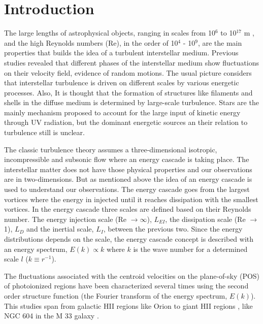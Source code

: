 \documentclass[fleqn,usenatbib, useAMS, a4paper]{mnras}
\begin{document}
\section{Introduction}

The large lengths of astrophysical objects, ranging in scales from 10$^{6}$ to 10$^{17}$ m \citep{2010ApJ...710..853C}, and the high Reynolds numbers (Re), in the order of 10$^{4}$ - 10$^{9}$, are the main properties that builds the idea of a turbulent interstellar medium.
Previous studies \citep{1999intu.conf.....F,2004ARA&A..42..211E,scalo2004interstellar} revealed that different phases of the interstellar medium show fluctuations on their velocity field, evidence of random motions.
The usual picture considers that interstellar turbulence is driven on different scales by various energetic processes.
Also, It is thought that the formation of structures like filaments and shells in the diffuse medium is determined by large-scale turbulence.
Stars are the mainly mechanism proposed to account for the large input of kinetic energy through UV radiation, but the dominant energetic sources an their relation to turbulence still is unclear.

The classic turbulence theory \citep{kolm1} assumes a three-dimensional isotropic, incompressible and subsonic flow where an energy cascade is taking place.
The interstellar matter does not have those physical properties and our observations are in two-dimensions.
But as mentioned above the idea of an energy cascade is used to understand our observations.
The energy cascade goes from the largest vortices where the energy in injected until it reaches dissipation with the smallest vortices.
In the energy cascade three scales are defined based on their Reynolds number.
The energy injection scale (Re $\rightarrow \infty$), $L_{EI}$, the dissipation scale (Re $\rightarrow$ 1), $L_{D}$ and the inertial scale, $L_{I}$, between the previous two.
Since the energy distributions depends on the scale, the energy cascade concept is described with an energy spectrum, $E(k) \propto k$ where $k$ is the wave number for a determined scale $l$ ($k \equiv r^{-1}$).

The fluctuations associated with the centroid velocities on the plane-of-sky (POS) of photoionized regions have been characterized several times using the second order structure function (the Fourier transform of the energy spectrum, $E(k)$).
This studies span from galactic HII regions like Orion \citep{von1951methode,munch1958internal,castaneda1988,1992ApJ...387..229O,arthur2016turbulence} to giant HII regions \citep{1961MNRAS.122....1F,lagrois2009multi,lagrois2011}, like NGC 604 in the M 33 galaxy \citep{tanco1997,2019arXiv191203543M}.
\end{document}
